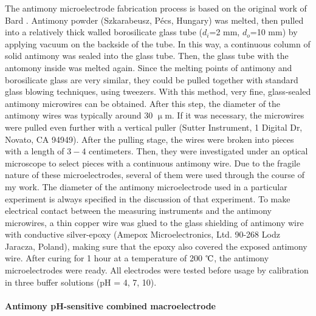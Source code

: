 The antimony microelectrode fabrication process is based on the original work of Bard \cite{horrocks1993scanning}.
Antimony powder (Szka\-ra\-be\-usz, Pécs, Hungary) was melted, then pulled into a relatively thick walled borosilicate glass tube ($d_i$=2 mm, $d_o$=10 mm) by applying vacuum on the backside of the tube.
In this way, a continuous column of solid antimony was sealed into the glass tube.
Then, the glass tube with the antomony inside was melted again.
Since the melting points of antimony and borosilicate glass are very similar, they could be pulled together with standard glass blowing techniques, using tweezers.
With this method, very fine, glass-sealed antimony microwires can be obtained.
After this step, the diameter of the antimony wires was typically around 30 $\upmu$m.
If it was necessary, the microwires were pulled even further with a vertical puller (Sutter Instrument, 1 Digital Dr, Novato, CA 94949).
After the pulling stage, the wires were broken into pieces with a length of $3-4$ centimeters.
Then, they were investigated under an optical microscope to select pieces with a continuous antimony wire.
Due to the fragile nature of these microelectrodes, several of them were used through the course of my work.
The diameter of the antimony microelectrode used in a particular experiment is always specified in the discussion of that experiment.
To make electrical contact between the measuring instruments and the antimony microwires, a thin copper wire was glued to the glass shielding of antimony wire with conductive silver-epoxy (Amepox Microelectronics, Ltd.
90-268 Lodz Jaracza, Poland), making sure that the epoxy also covered the exposed antimony wire.
After curing for 1 hour at a temperature of 200 $\celsius$, the antimony microelectrodes were ready.
All electrodes were tested before usage by calibration in three buffer solutions (pH = 4, 7, 10). 



\paragraph{Antimony pH-sensitive combined macroelectrode}

